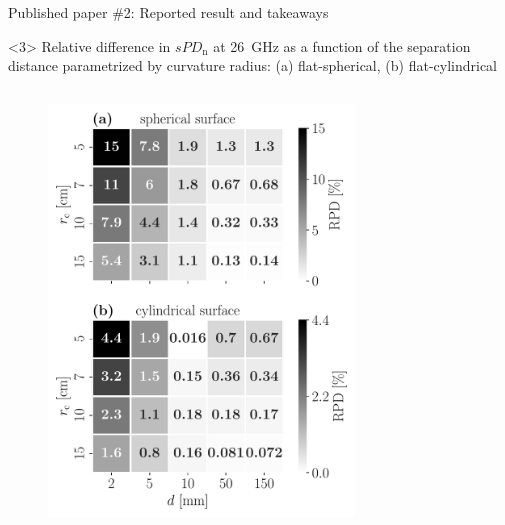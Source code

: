\documentclass[xcolor=dvipsnames,10pt]{beamer}
\begin{document}
\begin{frame}{Published paper \#2: Reported result and takeaways}
\begin{onlyenv}
\begin{figure}
        \end{figure}
    \end{onlyenv}
    \begin{onlyenv}<3>
        Relative difference in $sPD_\text{n}$ at \SI{26}{\GHz} as a function of the separation distance parametrized by curvature radius: (a) flat-spherical, (b) flat-cylindrical
        \begin{columns}[c]
            \begin{column}{0.5\textwidth}
                \begin{center}
                    \begin{figure}
                        \includegraphics[width=0.85\textwidth]{artwork/RPD-radius.pdf}
                    \end{figure}
                \end{center}
            \end{column}
            \begin{column}{0.5\textwidth}
                \begin{center}
                    \begin{figure}

\end{figure}
\end{center}
\end{column}
\end{columns}
\end{onlyenv}
\end{frame}
\end{document}
